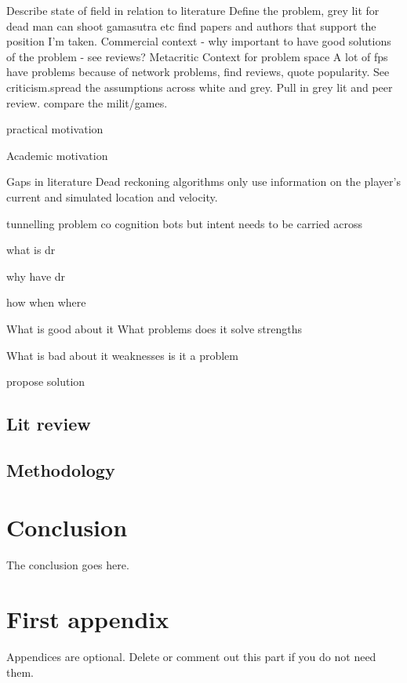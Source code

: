 \documentclass[journal]{IEEEtran}
\begin{document}
Describe state of field in relation to literature
Define the problem, grey lit for dead man can shoot gamasutra etc
find papers and authors that support the position I'm taken.
Commercial context - why important to have good solutions of the problem - see reviews? Metacritic
Context for problem space
A lot of fps have problems because of network problems, find reviews, quote popularity. See criticism.spread the assumptions across white and grey. Pull in grey lit and peer review. compare the milit/games.


practical motivation

Academic motivation

Gaps in literature
Dead reckoning algorithms only use information on the player's current and simulated location and velocity.

tunnelling problem
co cognition
bots but intent needs to be carried across



what is dr

why have dr

how when where

What is good about it 
What problems does it solve
strengths

What is bad about it
weaknesses
is it a problem

propose solution

\subsection{Lit review}


\subsection{Methodology}

\section{Conclusion}
The conclusion goes here.






\appendices
\section{First appendix}
Appendices are optional. Delete or comment out this part if you do not need them.

\end{document}
